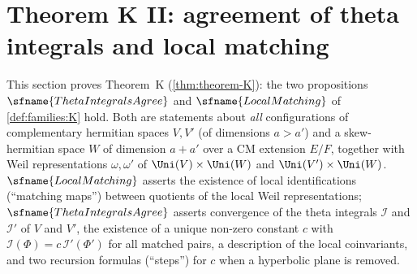 \section{Theorem K II: agreement of theta integrals and local matching}\label{sec:pf:thmK}

\providecommand{\thmKAE}{\mathbb{A}_E}
\providecommand{\thmKS}{\mathcal{S}}
\providecommand{\thmKSo}{\mathcal{S}^{\circ}}
\providecommand{\thmKPol}{\mathcal{P}}
\providecommand{\thmKPD}{\operatorname{PD}}
\providecommand{\thmKI}{\mathcal{I}}
\providecommand{\thmKaug}{\mathfrak{a}}
\providecommand{\thmKCT}{\operatorname{CT}}
\providecommand{\thmKst}{\operatorname{st}}
\providecommand{\thmKht}{\operatorname{ht}}
\providecommand{\thmKqht}{\operatorname{qht}}
\providecommand{\thmKcone}{\operatorname{cone}}
\providecommand{\thmKEv}{\operatorname{Ev}}
\providecommand{\thmKpure}{\operatorname{pure}}
\providecommand{\thmKSpl}{\operatorname{Spl}}
\providecommand{\thmKSt}{\operatorname{St}}
\providecommand{\thmKacts}[1]{\mathrel{\stackrel{#1}{\leadsto}}}
\providecommand{\thmKLS}[2]{L^{S_0}(#1,#2)}
\providecommand{\thmKvac}{\mathrm{vac}}

This section proves Theorem~K (\cref{thm:theorem-K}): the two propositions $\sfname{ThetaIntegralsAgree}$ and
$\sfname{LocalMatching}$ of \cref{def:families:K} hold. Both are statements about \emph{all} configurations of
complementary hermitian spaces $V,V'$ (of dimensions $a>a'$) and a skew-hermitian space $W$ of dimension $a+a'$ over a
CM extension $E/F$, together with Weil representations $\omega,\omega'$ of $\Uni(V)\times\Uni(W)$ and
$\Uni(V')\times\Uni(W)$. $\sfname{LocalMatching}$ asserts the existence of local identifications (``matching maps'')
between quotients of the local Weil representations; $\sfname{ThetaIntegralsAgree}$ asserts convergence of the theta
integrals $\thmKI$ and $\thmKI'$ of $V$ and $V'$, the existence of a unique non-zero constant $c$ with
$\thmKI(\Phi)=c\,\thmKI'(\Phi')$ for all matched pairs, a description of the local coinvariants, and two recursion
formulas (``steps'') for $c$ when a hyperbolic plane is removed.

